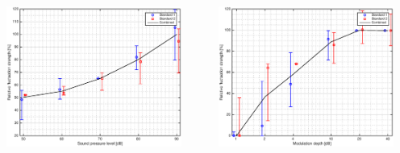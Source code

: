 \documentclass{beamer}
\begin{document}
\begin{frame}
  \vspace{2mm}

  \begin{columns}
    \begin{column}{0.5\textwidth}
      \includegraphics[width=0.9\textwidth]{AM-SPL_all_standards}
    \end{column}
    \begin{column}{0.5\textwidth}
      \includegraphics[width=0.9\textwidth]{AM-md_all_standards}
    \end{column}
  \end{columns}

\end{frame}
\end{document}
